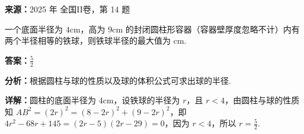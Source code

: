 \begin{question}[points=5]
\textbf{来源：}2025 年 全国II卷，第 14 题\par
一个底面半径为 $4\mathrm{cm}$，高为 $9\mathrm{cm}$ 的封闭圆柱形容器（容器壁厚度忽略不计）内有两个半径相等的铁球，则铁球半径的最大值为 $\mathrm{cm}$.
\fillin[{$\frac{5}{2}$}]
\begin{solution}
\textbf{答案：}$\frac{5}{2}$

\textbf{分析：}根据圆柱与球的性质以及球的体积公式可求出球的半径.

\textbf{详解：}圆柱的底面半径为 $4\mathrm{cm}$，设铁球的半径为 $r$，且 $r<4$，由圆柱与球的性质知 $AB^2=(2r)^2=(8-2r)^2+(9-2r)^2$，即 $4r^2-68r+145=(2r-5)(2r-29)=0$，因为 $r<4$，所以 $r=\frac{5}{2}$.
\end{solution}
\end{question}

